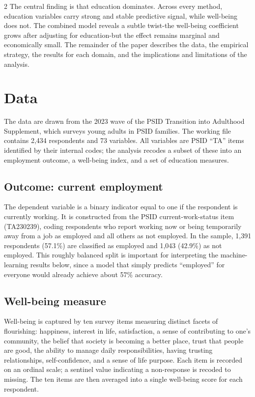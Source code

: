 \documentclass[
  11pt,
]{article}
\begin{document}
\begin{multicols}{2}
The central finding is that education dominates. Across every method, education variables carry strong and stable predictive signal, while well-being does not. The combined model reveals a subtle twist-the well-being coefficient grows after adjusting for education-but the effect remains marginal and economically small. The remainder of the paper describes the data, the empirical strategy, the results for each domain, and the implications and limitations of the analysis.

\section{Data}
The data are drawn from the 2023 wave of the PSID Transition into Adulthood Supplement, which surveys young adults in PSID families. The working file contains 2{,}434 respondents and 73 variables. All variables are PSID ``TA'' items identified by their internal codes; the analysis recodes a subset of these into an employment outcome, a well-being index, and a set of education measures.

\subsection{Outcome: current employment}
The dependent variable is a binary indicator equal to one if the respondent is currently working. It is constructed from the PSID current-work-status item (TA230239), coding respondents who report working now or being temporarily away from a job as employed and all others as not employed. In the sample, 1{,}391 respondents (57.1\%) are classified as employed and 1{,}043 (42.9\%) as not employed. This roughly balanced split is important for interpreting the machine-learning results below, since a model that simply predicts ``employed'' for everyone would already achieve about 57\% accuracy.

\subsection{Well-being measure}
Well-being is captured by ten survey items measuring distinct facets of flourishing: happiness, interest in life, satisfaction, a sense of contributing to one's community, the belief that society is becoming a better place, trust that people are good, the ability to manage daily responsibilities, having trusting relationships, self-confidence, and a sense of life purpose. Each item is recorded on an ordinal scale; a sentinel value indicating a non-response is recoded to missing. The ten items are then averaged into a single well-being score for each respondent.


\end{multicols}
\end{document}

